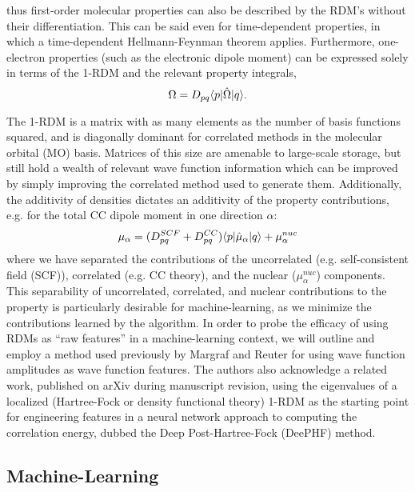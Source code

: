 thus first-order molecular properties can also be described by the RDM's without their differentiation. This can be said even for time-dependent properties, in which a time-dependent Hellmann-Feynman theorem applies.\cite{Norman2011} Furthermore, one-electron properties (such as the electronic dipole moment) can be expressed solely in terms of the 1-RDM and the relevant property integrals,
\begin{equation} \label{eq:prop}
    \Omega = D_{pq}\langle p |\hat{\Omega}| q \rangle.
\end{equation}

The 1-RDM is a matrix with as many elements as the number of basis functions squared, and is diagonally dominant for correlated methods in the molecular orbital (MO) basis. Matrices of this size are amenable to large-scale storage, but still hold a wealth of relevant wave function information which can be improved by simply improving the correlated method used to generate them. Additionally, the additivity of densities dictates an additivity of the property contributions, e.g. for the total CC dipole moment in one direction $\alpha$: 
\begin{equation} \label{eq:dipole}
    \mu_\alpha = (D^{SCF}_{pq} + D^{CC}_{pq})\langle p |\hat{\mu}_\alpha| q \rangle + \mu_\alpha^{nuc}
\end{equation}
where we have separated the contributions of the uncorrelated (e.g. self-consistent field (SCF)), correlated (e.g. CC theory), and the nuclear ($\mu_\alpha^{nuc}$) components.
This separability of uncorrelated, correlated, and nuclear contributions to the property is particularly desirable for machine-learning, as we minimize the contributions learned by the algorithm. In order to probe the efficacy of using RDMs as ``raw features'' in a machine-learning context, we will outline and employ a method used previously by Margraf and Reuter\cite{Margraf2018} for using wave function amplitudes as wave function features. The authors also acknowledge a related work\cite{Chen2020}, published on arXiv during manuscript revision, using the eigenvalues of a localized (Hartree-Fock or density functional theory) 1-RDM as the starting point for engineering features in a neural network approach to computing the correlation energy, dubbed the Deep Post-Hartree-Fock (DeePHF) method.

\subsection{Machine-Learning} \label{ml}

